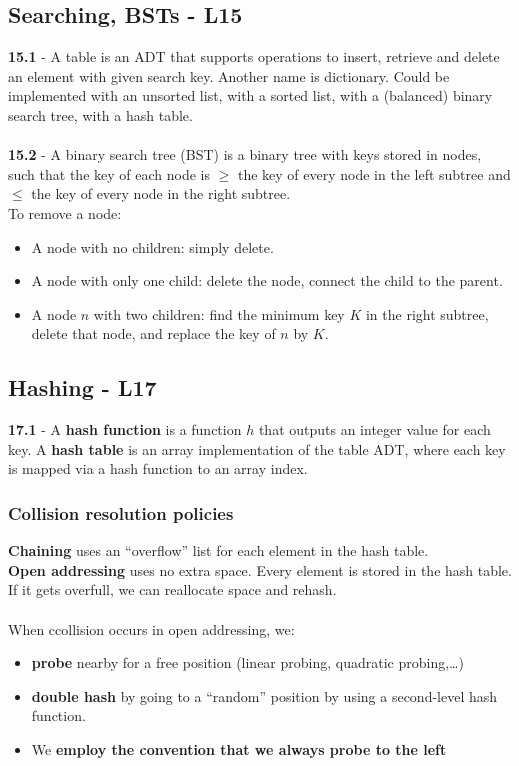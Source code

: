 \documentclass[a4paper]{article}
\begin{document}
\subsection*{Searching, BSTs - L15} 
\textbf{15.1} - A table is an ADT that supports operations to insert, retrieve and
delete an element with given search key. Another name is dictionary. Could be
implemented with an unsorted list, with a sorted list, with a (balanced) binary
search tree, with a hash table.\\\\
\textbf{15.2} - A binary search tree (BST) is a binary tree with keys stored in
nodes, such that the key of each node is $\geq$ the key of every node in the left subtree
and $\leq$ the key of every node in the right subtree.\\To remove a node:
\begin{itemize}
    \item A node with no children: simply delete.
    \item A node with only one child: delete the node, connect the child to the parent.
    \item A node $n$ with two children: find the minimum key $K$ in the right subtree,
    delete that node, and replace the key of $n$ by $K$.
\end{itemize}

\subsection*{Hashing - L17}
\textbf{17.1} - A \textbf{hash function} is a function $h$ that outputs an integer value for
each key. A \textbf{hash table} is an array implementation of the table ADT, where each
key is mapped via a hash function to an array index.
\subsubsection*{Collision resolution policies}
\textbf{Chaining} uses an “overflow” list for each element in the hash table.\\
\textbf{Open addressing} uses no extra space. Every element is stored in the hash
table. If it gets overfull, we can reallocate space and rehash.\\\\
When ccollision occurs in open addressing, we:
\begin{itemize}
    \item \textbf{probe} nearby for a free position (linear probing, quadratic probing,\dots)
    \item \textbf{double hash} by going to a “random” position by using a second-level hash function.
    \item We \textbf{employ the convention that we always probe to the left}
\end{itemize}
\end{document}
